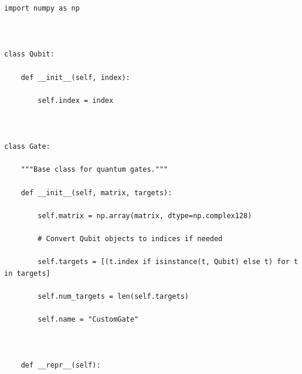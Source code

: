 \documentclass{beamer}
\begin{document}
\begin{frame}

































































\begin{verbatim}
import numpy as np



class Qubit:

    def __init__(self, index):

        self.index = index



class Gate:

    """Base class for quantum gates."""

    def __init__(self, matrix, targets):

        self.matrix = np.array(matrix, dtype=np.complex128)

        # Convert Qubit objects to indices if needed

        self.targets = [(t.index if isinstance(t, Qubit) else t) for t in targets]

        self.num_targets = len(self.targets)

        self.name = "CustomGate"



    def __repr__(self):


\end{verbatim}
\end{frame}
\end{document}
